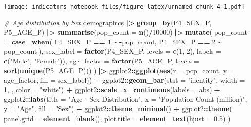 \documentclass[
]{article}
\newenvironment{Shaded}{\begin{snugshade}}{\end{snugshade}}
\newcommand{\AttributeTok}[1]{\textcolor[rgb]{0.13,0.29,0.53}{#1}}
\newcommand{\CommentTok}[1]{\textcolor[rgb]{0.56,0.35,0.01}{\textit{#1}}}
\newcommand{\DecValTok}[1]{\textcolor[rgb]{0.00,0.00,0.81}{#1}}
\newcommand{\FloatTok}[1]{\textcolor[rgb]{0.00,0.00,0.81}{#1}}
\newcommand{\FunctionTok}[1]{\textcolor[rgb]{0.13,0.29,0.53}{\textbf{#1}}}
\newcommand{\NormalTok}[1]{#1}
\newcommand{\SpecialCharTok}[1]{\textcolor[rgb]{0.81,0.36,0.00}{\textbf{#1}}}
\newcommand{\StringTok}[1]{\textcolor[rgb]{0.31,0.60,0.02}{#1}}
\begin{document}
\texttt{[image: indicators\_notebook\_files/figure-latex/unnamed-chunk-4-1.pdf]}

\begin{Shaded}
\begin{Highlighting}[]
\CommentTok{\# Age distribution by Sex}
\NormalTok{demographics }\SpecialCharTok{|\textgreater{}}
  \FunctionTok{group\_by}\NormalTok{(P4\_SEX\_P, P5\_AGE\_P) }\SpecialCharTok{|\textgreater{}}
  \FunctionTok{summarise}\NormalTok{(}\AttributeTok{pop\_count =} \FunctionTok{n}\NormalTok{()}\SpecialCharTok{/}\DecValTok{10000}\NormalTok{) }\SpecialCharTok{|\textgreater{}}
  \FunctionTok{mutate}\NormalTok{(}
    \AttributeTok{pop\_count =} \FunctionTok{case\_when}\NormalTok{(}
\NormalTok{      P4\_SEX\_P }\SpecialCharTok{==} \DecValTok{1} \SpecialCharTok{\textasciitilde{}} \SpecialCharTok{{-}}\NormalTok{pop\_count,}
\NormalTok{      P4\_SEX\_P }\SpecialCharTok{==} \DecValTok{2} \SpecialCharTok{\textasciitilde{}}\NormalTok{ pop\_count}
\NormalTok{    ),}
    \AttributeTok{sex\_label =} \FunctionTok{factor}\NormalTok{(P4\_SEX\_P, }\AttributeTok{levels =} \FunctionTok{c}\NormalTok{(}\DecValTok{1}\NormalTok{, }\DecValTok{2}\NormalTok{), }\AttributeTok{labels =} \FunctionTok{c}\NormalTok{(}\StringTok{"Male"}\NormalTok{, }\StringTok{"Female"}\NormalTok{)),}
    \AttributeTok{age\_factor =} \FunctionTok{factor}\NormalTok{(P5\_AGE\_P, }\AttributeTok{levels =} \FunctionTok{sort}\NormalTok{(}\FunctionTok{unique}\NormalTok{(P5\_AGE\_P)))}
\NormalTok{  ) }\SpecialCharTok{|\textgreater{}}
\NormalTok{  ggplot2}\SpecialCharTok{::}\FunctionTok{ggplot}\NormalTok{(}\FunctionTok{aes}\NormalTok{(}\AttributeTok{x =}\NormalTok{ pop\_count, }\AttributeTok{y =}\NormalTok{ age\_factor, }\AttributeTok{fill =}\NormalTok{ sex\_label)) }\SpecialCharTok{+}
\NormalTok{  ggplot2}\SpecialCharTok{::}\FunctionTok{geom\_bar}\NormalTok{(}\AttributeTok{stat =} \StringTok{"identity"}\NormalTok{, }\AttributeTok{width =} \DecValTok{1}\NormalTok{, , }\AttributeTok{color =} \StringTok{"white"}\NormalTok{) }\SpecialCharTok{+}
\NormalTok{  ggplot2}\SpecialCharTok{::}\FunctionTok{scale\_x\_continuous}\NormalTok{(}\AttributeTok{labels =}\NormalTok{ abs) }\SpecialCharTok{+}
\NormalTok{  ggplot2}\SpecialCharTok{::}\FunctionTok{labs}\NormalTok{(}\AttributeTok{title =} \StringTok{"Age {-} Sex Distribution"}\NormalTok{,}
                \AttributeTok{x =} \StringTok{"Population Count (million)"}\NormalTok{, }
                \AttributeTok{y =} \StringTok{"Age"}\NormalTok{, }
                \AttributeTok{fill =} \StringTok{"Sex"}\NormalTok{) }\SpecialCharTok{+}
\NormalTok{  ggplot2}\SpecialCharTok{::}\FunctionTok{theme\_minimal}\NormalTok{() }\SpecialCharTok{+}
\NormalTok{  ggplot2}\SpecialCharTok{::}\FunctionTok{theme}\NormalTok{(}
    \AttributeTok{panel.grid =} \FunctionTok{element\_blank}\NormalTok{(),}
    \AttributeTok{plot.title =} \FunctionTok{element\_text}\NormalTok{(}\AttributeTok{hjust =} \FloatTok{0.5}\NormalTok{)}
\NormalTok{  )}
\end{Highlighting}
\end{Shaded}
\end{document}
